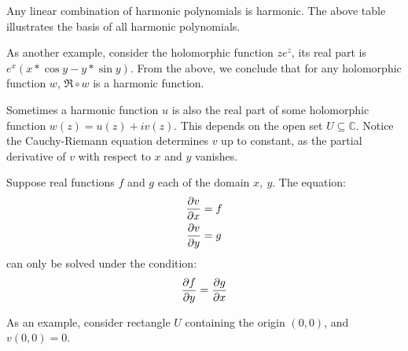 \documentclass[12pt]{article}
\begin{document}
	Any linear combination of harmonic polynomials is harmonic. The above table illustrates the basis of all harmonic polynomials.
	
	As another example, consider the holomorphic function $ze^z$, its real part is $e^x(x*\cos y - y*\sin y)$. From the above, we conclude that for any holomorphic function $w$, $\Re \circ w$ is a harmonic function.
	
	Sometimes a harmonic function $u$ is also the real part of some holomorphic function $w(z) = u(z) + iv(z)$. This depends on the open set $U \subseteq \mathbb{C}$. Notice the Cauchy-Riemann equation determines $v$ up to constant, as the partial derivative of $v$ with respect to $x$ and $y$ vanishes.
	
	Suppose real functions $f$ and $g$ each of the domain $x,\ y$. The equation:
	\begin{align*}
		\frac{\partial v}{\partial x} &= f \\
		\frac{\partial v}{\partial y} &=g
	\end{align*}
	can only be solved under the condition: $$\frac{\partial f}{\partial y} = \frac{\partial g}{\partial x}$$
	
	As an example, consider rectangle $U$ containing the origin $(0, 0)$, and $v(0, 0) = 0$.
	
\end{document}
